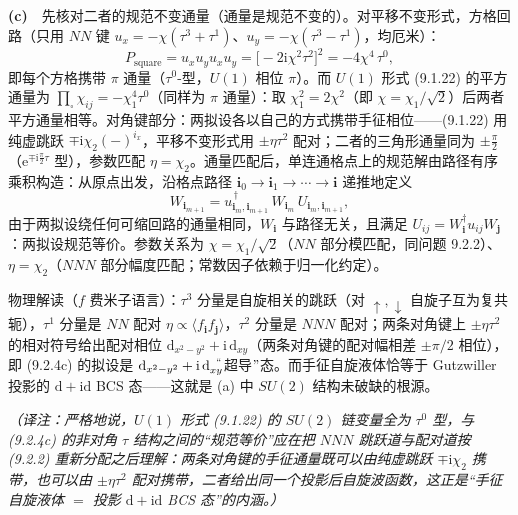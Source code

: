 \textbf{(c)}　先核对二者的规范不变通量（通量是规范不变的）。对平移不变形式，方格回路（只用 $NN$ 键 $u_x=-\chi(\tau^3+\tau^1)$、$u_y=-\chi(\tau^3-\tau^1)$，均厄米）：
\begin{equation*}
P_{\text{square}}=u_xu_yu_xu_y=\big[-2\mathrm{i}\chi^{2}\tau^{2}\big]^{2}=-4\chi^{4}\,\tau^{0} ,
\end{equation*}
即每个方格携带 $\pi$ 通量（$\tau^{0}$-型，$U(1)$ 相位 $\pi$）。而 $U(1)$ 形式 (9.1.22) 的平方通量为 $\prod_{\square}\chi_{ij}=-\chi_1^{4}\tau^0$（同样为 $\pi$ 通量）：取 $\chi_1^{2}=2\chi^{2}$（即 $\chi=\chi_1/\sqrt2$）后两者平方通量相等。对角键部分：两拟设各以自己的方式携带手征相位——(9.1.22) 用纯虚跳跃 $\mp\mathrm{i}\chi_2(-)^{i_x}$，平移不变形式用 $\pm\eta\tau^2$ 配对；二者的三角形通量同为 $\pm\frac{\pi}{2}$（$\mathrm{e}^{\mp\mathrm{i}\frac{\pi}{2}\tau}$ 型），参数匹配 $\eta=\chi_2$。通量匹配后，单连通格点上的规范解由路径有序乘积构造：从原点出发，沿格点路径 $\pmb{i}_0\to\pmb{i}_1\to\cdots\to\pmb{i}$ 递推地定义
\begin{equation*}
W_{\pmb{i}_{m+1}}=u_{\pmb{i}_m,\pmb{i}_{m+1}}^{\,\dagger}\,W_{\pmb{i}_m}\,U_{\pmb{i}_m,\pmb{i}_{m+1}} ,
\end{equation*}
由于两拟设绕任何可缩回路的通量相同，$W_{\pmb{i}}$ 与路径无关，且满足 $U_{ij}=W^{\dagger}_{\pmb{i}}u_{ij}W_{\pmb{j}}$：两拟设规范等价。参数关系为 $\chi=\chi_1/\sqrt2$（$NN$ 部分模匹配，同问题 9.2.2）、$\eta=\chi_2$（$NNN$ 部分幅度匹配；常数因子依赖于归一化约定）。

物理解读（$f$ 费米子语言）：$\tau^3$ 分量是自旋相关的跳跃（对 $\uparrow,\downarrow$ 自旋子互为复共轭），$\tau^1$ 分量是 $NN$ 配对 $\eta\propto\langle f_{\pmb{i}}f_{\pmb{j}}\rangle$，$\tau^2$ 分量是 $NNN$ 配对；两条对角键上 $\pm\eta\tau^2$ 的相对符号给出配对相位 $\mathrm{d}_{x^2-y^2}+\mathrm{i}\,\mathrm{d}_{xy}$（两条对角键的配对幅相差 $\pm\pi/2$ 相位），即 (9.2.4c) 的拟设是 $\mathrm{d}_{x^2-y^2}+\mathrm{i}\,\mathrm{d}_{xy}^{\;\;``}$超导$"$态。而手征自旋液体恰等于 Gutzwiller 投影的 $\mathrm{d}+\mathrm{id}$ BCS 态——这就是 (a) 中 $SU(2)$ 结构未破缺的根源。

\emph{（译注：严格地说，$U(1)$ 形式 (9.1.22) 的 $SU(2)$ 链变量全为 $\tau^0$ 型，与 (9.2.4c) 的非对角 $\tau$ 结构之间的“规范等价”应在把 $NNN$ 跳跃道与配对道按 (9.2.2) 重新分配之后理解：两条对角键的手征通量既可以由纯虚跳跃 $\mp\mathrm{i}\chi_2$ 携带，也可以由 $\pm\eta\tau^2$ 配对携带，二者给出同一个投影后自旋波函数，这正是“手征自旋液体 $=$ 投影 $\mathrm{d}+\mathrm{id}$ BCS 态”的内涵。）}

